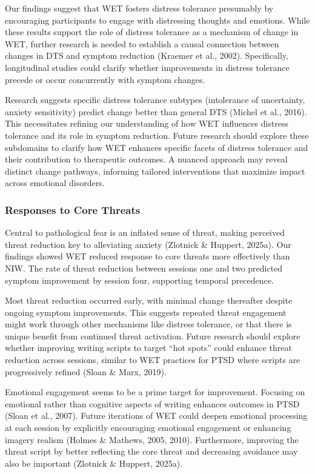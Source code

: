 \documentclass[
  man,floatsintext]{apa7}
\begin{document}
Our findings suggest that WET fosters distress tolerance presumably by encouraging participants to engage with distressing thoughts and emotions.
While these results support the role of distress tolerance as a mechanism of change in WET, further research is needed to establish a causal connection between changes in DTS and symptom reduction (Kraemer et al., 2002).
Specifically, longitudinal studies could clarify whether improvements in distress tolerance precede or occur concurrently with symptom changes.

Research suggests specific distress tolerance subtypes (intolerance of uncertainty, anxiety sensitivity) predict change better than general DTS (Michel et al., 2016).
This necessitates refining our understanding of how WET influences distress tolerance and its role in symptom reduction.
Future research should explore these subdomains to clarify how WET enhances specific facets of distress tolerance and their contribution to therapeutic outcomes.
A nuanced approach may reveal distinct change pathways, informing tailored interventions that maximize impact across emotional disorders.

\subsubsection{Responses to Core Threats}\label{responses-to-core-threats}

Central to pathological fear is an inflated sense of threat, making perceived threat reduction key to alleviating anxiety (Zlotnick \& Huppert, 2025a).
Our findings showed WET reduced response to core threats more effectively than NIW.
The rate of threat reduction between sessions one and two predicted symptom improvement by session four, supporting temporal precedence.

Most threat reduction occurred early, with minimal change thereafter despite ongoing symptom improvements.
This suggests repeated threat engagement might work through other mechanisms like distress tolerance, or that there is unique benefit from continued threat activation.
Future research should explore whether improving writing scripts to target ``hot spots'' could enhance threat reduction across sessions, similar to WET practices for PTSD where scripts are progressively refined (Sloan \& Marx, 2019).

Emotional engagement seems to be a prime target for improvement.
Focusing on emotional rather than cognitive aspects of writing enhances outcomes in PTSD (Sloan et al., 2007).
Future iterations of WET could deepen emotional processing at each session by explicitly encouraging emotional engagement or enhancing imagery realism (Holmes \& Mathews, 2005, 2010).
Furthermore, improving the threat script by better reflecting the core threat and decreasing avoidance may also be important (Zlotnick \& Huppert, 2025a).
\end{document}
